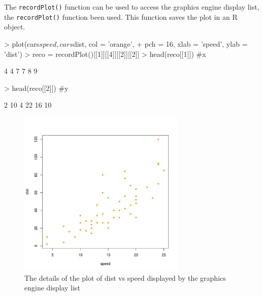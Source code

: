 \documentclass[paper=a4, fontsize=11pt]{report}
\begin{document}
The \texttt{recordPlot()} function can be used to access the graphics engine display list, the \texttt{recordPlot()} function been used. This function saves the plot in an R object. 

\begin{Schunk}
\begin{Sinput}
> plot(cars$speed, cars$dist, col = 'orange', 
+       pch = 16, xlab = 'speed', ylab = 'dist')
> reco = recordPlot()[[1]][[4]][[2]][[2]]
> head(reco[[1]]) #x
\end{Sinput}
\begin{Soutput}
[1] 4 4 7 7 8 9
\end{Soutput}
\begin{Sinput}
> head(reco[[2]]) #y
\end{Sinput}
\begin{Soutput}
[1]  2 10  4 22 16 10
\end{Soutput}
\end{Schunk}


\begin{figure}[h]
\begin{center}
  \includegraphics[height = 8cm, width = 8cm]{figure/report_3.pdf}
  \caption{The details of the plot of dist vs speed displayed by the graphics engine display list}
  	\label{figure4}
\end{center}
\end{figure}
\end{document}

